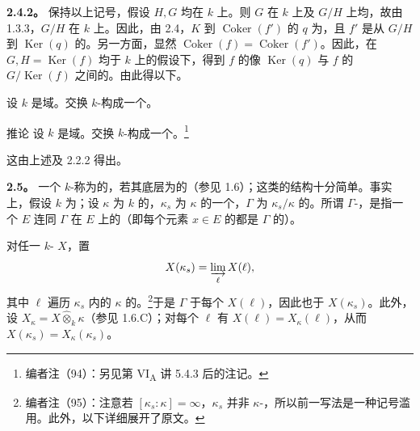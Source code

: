 \textbf{2.4.2。} 保持以上记号，假设 $H,G$ 均在 $k$ 上。则 $G$ 在 $k$ 上及 $G/H$ 上均，故由 1.3.3，$G/H$ 在 $k$ 上。因此，由 2.4，$K$ 到 $\operatorname{Coker}(f')$ 的 $q$ 为，且 $f'$ 是从 $G/H$ 到 $\operatorname{Ker}(q)$ 的。另一方面，显然 $\operatorname{Coker}(f)=\operatorname{Coker}(f')$。因此，在 $G,H=\operatorname{Ker}(f)$ 均于 $k$ 上的假设下，得到 $f$ 的像 $\operatorname{Ker}(q)$ 与 $f$ 的 $G/\operatorname{Ker}(f)$ 之间的。由此得以下。
\begin{SGAresult}{}{}
设 $k$ 是域。交换 $k$-构成一个。
\end{SGAresult}
\begin{SGAresult}{推论}{}
设 $k$ 是域。交换 $k$-构成一个。\footnote{编者注（94）：另见第 VI\textsubscript{A} 讲 5.4.3 后的注记。}
\end{SGAresult}
这由上述及 2.2.2 得出。

\textbf{2.5。} 一个 $k$-称为的，若其底层为的（参见 1.6）；这类的结构十分简单。事实上，假设 $k$ 为；设 $\kappa$ 为 $k$ 的，$\kappa_s$ 为 $\kappa$ 的一个，$\Gamma$ 为 $\kappa_s/\kappa$ 的。所谓 $\Gamma$-，是指一个 $E$ 连同 $\Gamma$ 在 $E$ 上的（即每个元素 $x\in E$ 的都是 $\Gamma$ 的）。

对任一 $k$- $X$，置
\[
X(\kappa_s)=\varinjlim_\ell X(\ell),
\]
其中 $\ell$ 遍历 $\kappa_s$ 内的 $\kappa$ 的。\footnote{编者注（95）：注意若 $[\kappa_s:\kappa]=\infty$，$\kappa_s$ 并非 $\kappa$-，所以前一写法是一种记号滥用。此外，以下详细展开了原文。}于是 $\Gamma$ 于每个 $X(\ell)$，因此也于 $X(\kappa_s)$。此外，设 $X_\kappa=X\widehat\otimes_k\kappa$（参见 1.6.C）；对每个 $\ell$ 有 $X(\ell)=X_\kappa(\ell)$，从而 $X(\kappa_s)=X_\kappa(\kappa_s)$。

